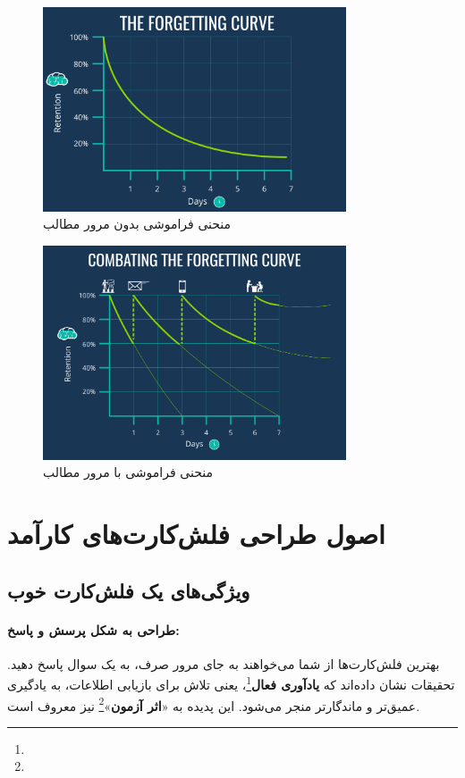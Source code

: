 \documentclass[12pt]{report}
\begin{document}
\begin{figure}[h!]
  \centering
  \includegraphics[width=0.8\textwidth]{images/forgetting-curve.png}
  \caption{منحنی فراموشی بدون مرور مطالب}
  \label{fig:forgetting-curve}
\end{figure}

\begin{figure}[h!]
  \centering
  \includegraphics[width=0.8\textwidth]{images/forgetting-curve-with-repetition.png}
  \caption{منحنی فراموشی با مرور مطالب}
  \label{fig:forgetting-curve-with-repetition}
\end{figure}

\chapter{اصول طراحی فلش‌کارت‌های کارآمد}


\section{ویژگی‌های یک فلش‌کارت خوب}

    \subsubsection{طراحی به شکل پرسش و پاسخ:} بهترین فلش‌کارت‌ها از شما می‌خواهند به جای مرور صرف، به یک سوال پاسخ دهید. تحقیقات نشان داده‌اند که \textbf{یادآوری فعال}\footnote{}، یعنی تلاش برای بازیابی اطلاعات، به یادگیری عمیق‌تر و ماندگارتر منجر می‌شود. این پدیده به «\textbf{اثر آزمون}»\footnote{} نیز معروف است.
\end{document}
